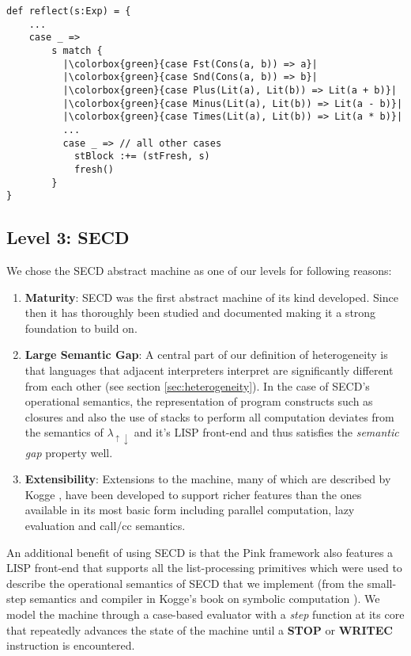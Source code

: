 \documentclass[a4paper,12pt,twoside,openright]{report}
\theoremstyle{definition}
\newcommand{\mslang}{$\lambda_{\uparrow\downarrow}$}
\begin{document}
\begin{verbatim}
def reflect(s:Exp) = {
    ...
    case _ =>
        s match {
          |\colorbox{green}{case Fst(Cons(a, b)) => a}|
          |\colorbox{green}{case Snd(Cons(a, b)) => b}|
          |\colorbox{green}{case Plus(Lit(a), Lit(b)) => Lit(a + b)}|
          |\colorbox{green}{case Minus(Lit(a), Lit(b)) => Lit(a - b)}|
          |\colorbox{green}{case Times(Lit(a), Lit(b)) => Lit(a * b)}|
          ...
          case _ => // all other cases
            stBlock :+= (stFresh, s)
            fresh()
        }
}
\end{verbatim}

\subsection{Level 3: SECD}\label{sec:secd}
We chose the SECD abstract machine as one of our levels for following reasons:
\begin{enumerate}
	\item \textbf{Maturity}: SECD was the first abstract machine of its kind developed. Since then it has thoroughly been studied and documented \cite{danvy2004rational,ramsdell1999tail,henderson1980functional} making it a strong foundation to build on.
	\item \textbf{Large Semantic Gap}: A central part of our definition of heterogeneity is that languages that adjacent interpreters interpret are significantly different from each other (see section \ref{sec:heterogeneity}). In the case of SECD's operational semantics, the representation of program constructs such as closures and also the use of stacks to perform all computation deviates from the semantics of \mslang{} and it's LISP front-end and thus satisfies the \textit{semantic gap} property well.
	\item \textbf{Extensibility}: Extensions to the machine, many of which are described by Kogge \cite{kogge1990architecture}, have been developed to support richer features than the ones available in its most basic form including parallel computation, lazy evaluation and call/cc semantics.
\end{enumerate}
An additional benefit of using SECD is that the Pink framework also features a LISP front-end that supports all the list-processing primitives which were used to describe the operational semantics of SECD that we implement (from the small-step semantics and compiler in Kogge's book on symbolic computation \cite{kogge1990architecture}). We model the machine through a case-based evaluator with a \textit{step} function at its core that repeatedly advances the state of the machine until a \textbf{STOP} or \textbf{WRITEC} instruction is encountered.
\end{document}
